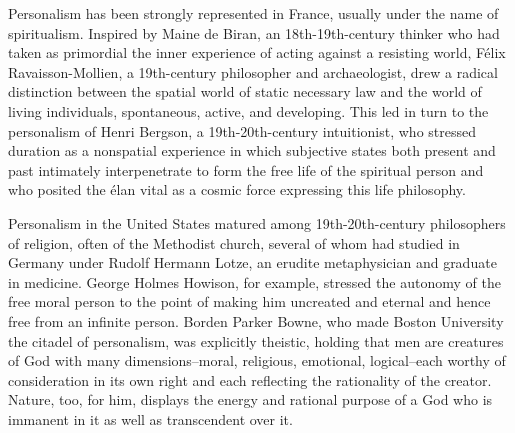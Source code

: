 \documentclass[12pt]{article}
\begin{document}
                                      Personalism has been strongly represented in France, usually under
                                      the name of spiritualism. Inspired by Maine de Biran, an
                                      18th-19th-century thinker who had taken as primordial the inner
                                      experience of acting against a resisting world, F\'{e}lix
                                      Ravaisson-Mollien, a 19th-century philosopher and archaeologist,
                                      drew a radical distinction between the spatial world of static
                                      necessary law and the world of living individuals, spontaneous,
                                      active, and developing. This led in turn to the personalism of Henri
                                      Bergson, a 19th-20th-century intuitionist, who stressed duration as a
                                      nonspatial experience in which subjective states both present and
                                      past intimately interpenetrate to form the free life of the spiritual
                                      person and who posited the \'{e}lan vital as a cosmic force expressing
                                      this life philosophy. 

                                      Personalism in the United States matured among 19th-20th-century
                                      philosophers of religion, often of the Methodist church, several of
                                      whom had studied in Germany under Rudolf Hermann Lotze, an erudite
                                      metaphysician and graduate in medicine. George Holmes Howison, for
                                      example, stressed the autonomy of the free moral person to the point
                                      of making him uncreated and eternal and hence free from an infinite
                                      person. Borden Parker Bowne, who made Boston University the citadel
                                      of personalism, was explicitly theistic, holding that men are
                                      creatures of God with many dimensions--moral, religious, emotional,
                                      logical--each worthy of consideration in its own right and each
                                      reflecting the rationality of the creator. Nature, too, for him, displays
                                      the energy and rational purpose of a God who is immanent in it as
                                      well as transcendent over it. 
\end{document}
